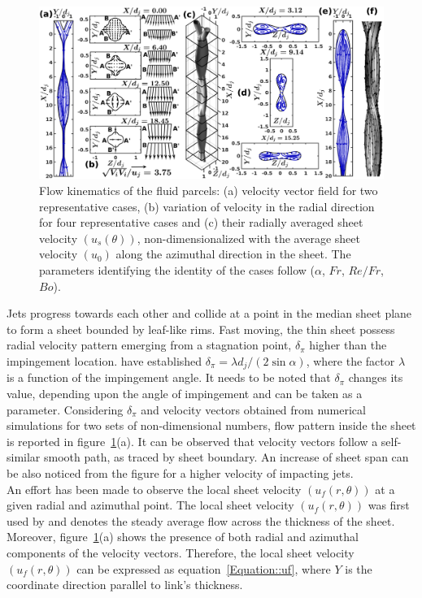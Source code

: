 \documentclass[%
 aip,
 sd,%
amsmath,amssymb,
preprint,%
author-year,%
]{revtex4-1}
\begin{document}
\begin{figure}
	\centering
	\includegraphics[width=\linewidth]{Figure5}
	\caption{Flow kinematics of the fluid parcels: (a) velocity vector field for two representative cases, (b) variation of velocity in the radial direction for four representative cases and (c) their radially averaged sheet velocity $\left(u_s(\theta)\right)$, non-dimensionalized with the average sheet velocity $\left(u_0\right)$ along the azimuthal direction in the sheet. The parameters identifying the identity of the cases follow ($\alpha$, $Fr$, $Re/Fr$, $Bo$).}
	\label{Figure::velocityVectors}%
\end{figure}
Jets progress towards each other and collide at a point in the median sheet plane to form a sheet bounded by leaf-like rims. Fast moving, the thin sheet possess radial velocity pattern emerging from a stagnation point, $\delta_\pi$ higher than the impingement location. \cite{inamura2014effect} have established $\delta_\pi = \lambda d_j/(2\sin\alpha)$, where the factor $\lambda$ is a function of the impingement angle. It needs to be noted that $\delta_\pi$ changes its value, depending upon the angle of impingement and can be taken as a parameter. Considering $\delta_\pi$ and velocity vectors obtained from numerical simulations for two sets of non-dimensional numbers, flow pattern inside the sheet is reported in figure~\ref{Figure::velocityVectors}(a). It can be observed that velocity vectors follow a self-similar smooth path, as traced by sheet boundary. An increase of sheet span can be also noticed from the figure for a higher velocity of impacting jets.\\
An effort has been made to observe the {\color{red}local sheet velocity $\left(u_f(r,\theta)\right)$} at a given radial and azimuthal point. {\color{red}The local sheet velocity $\left(u_f(r,\theta)\right)$ was first used by \cite{choo2002velocity} and denotes the steady average flow across the thickness of the sheet. Moreover, figure~\ref{Figure::velocityVectors}(a) shows the presence of both radial and azimuthal components of the velocity vectors.} Therefore, the local sheet velocity $\left(u_f(r,\theta)\right)$ can be expressed as equation~\ref{Equation::uf}, where $Y$ is the coordinate direction parallel to link's thickness.
\end{document}
